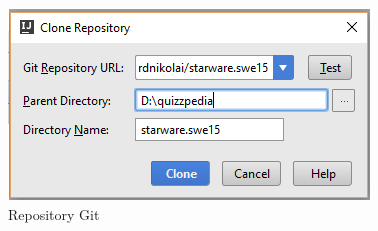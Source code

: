\documentclass[12pt,a4paper]{article}
\begin{document}
	\begin{center}
		\begin{figure}[H]
			\centering \includegraphics[max width=\myheight]{../img/manualeSviluppatore/repo.png}
			\caption{Repository Git}
		\end{figure}
	\end{center}
	\newpage
	
	
\end{document}
